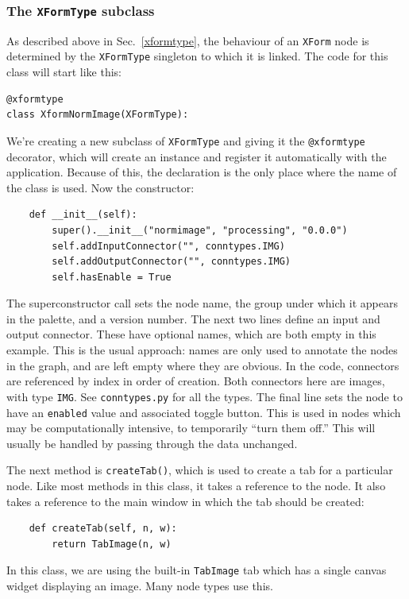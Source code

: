\subsubsection{The \texttt{XFormType} subclass}
As described above in Sec.~\ref{xformtype}, the behaviour of an \texttt{XForm} node is determined
by the \texttt{XFormType} singleton to which it is linked. The code for this class will start like this:
\begin{lstlisting}
@xformtype
class XformNormImage(XFormType):
\end{lstlisting}
We're creating a new subclass of \texttt{XFormType} and giving it the
\texttt{@xformtype} decorator, which will create an instance and register it
automatically with the application. Because of this, the declaration is the
only place where the name of the class is used. Now the constructor:
\begin{lstlisting}
    def __init__(self):
        super().__init__("normimage", "processing", "0.0.0")
        self.addInputConnector("", conntypes.IMG)
        self.addOutputConnector("", conntypes.IMG)
        self.hasEnable = True
\end{lstlisting}
The superconstructor call sets the node name, the group under which it appears
in the palette, and a version number. The next two lines define an input and
output connector. These have optional names, which are both empty in this
example. This is the usual approach: names are only used to annotate the nodes
in the graph, and are left empty where they are obvious. In the code,
connectors are referenced by index in order of creation. Both connectors here
are images, with type \texttt{IMG}. See \texttt{conntypes.py} for all the
types. The final line sets the node to have an \texttt{enabled} value and
associated toggle button. This is used in nodes which may be computationally
intensive, to temporarily ``turn them off.'' This will usually be handled by
passing through the data unchanged.

The next method is \texttt{createTab()}, which is used to create a tab for a particular node. Like most
methods in this class, it takes a reference to the node. It also takes a reference to the main window
in which the tab should be created:
\begin{lstlisting}
    def createTab(self, n, w):
        return TabImage(n, w)
\end{lstlisting}
In this class, we are using the built-in \texttt{TabImage} tab which has a single canvas widget
displaying an image. Many node types use this.

